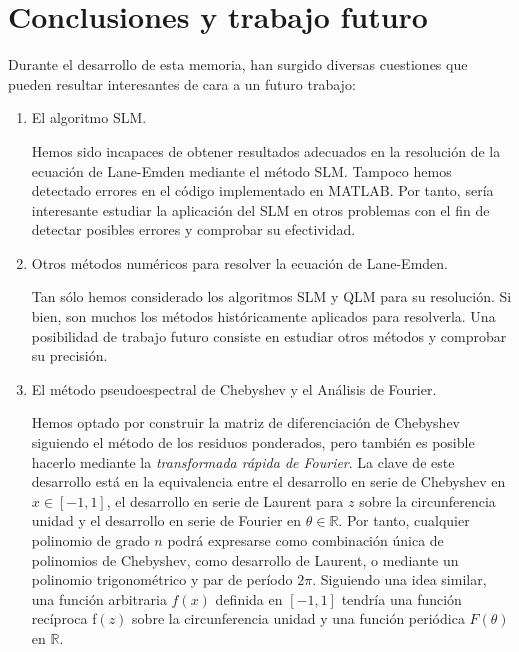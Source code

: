 \documentclass[main.tex]{subfiles}
\begin{document}
\chapter*{Conclusiones y trabajo futuro}
		
Durante el desarrollo de esta memoria, han surgido diversas
cuestiones que pueden resultar interesantes de cara a un futuro
trabajo:
	
\begin{enumerate}[label=\textbullet]
		
		
		
  \item El algoritmo SLM.
		
  Hemos sido incapaces de obtener resultados adecuados en la
  resolución de la ecuación de Lane-Emden mediante el método SLM. 
  Tampoco hemos detectado errores en el código implementado en MATLAB. 
  Por tanto, sería interesante estudiar la aplicación del SLM en otros
  problemas con el fin de detectar posibles errores y comprobar su
  efectividad.
	
  \item Otros métodos numéricos para resolver la ecuación de
  Lane-Emden.
		
Tan sólo hemos considerado los algoritmos SLM y QLM
  para su resolución. 
  Si bien, son muchos los métodos históricamente aplicados para
  resolverla. 
  Una posibilidad de trabajo futuro consiste en estudiar otros métodos
  y comprobar su precisión. 
		
		
		
		
  \item El método pseudoespectral de Chebyshev y el Análisis de Fourier.
		
  Hemos optado por construir la matriz de diferenciación de Chebyshev siguiendo el método de los residuos
  ponderados, pero también es posible hacerlo mediante la {\itshape
   transformada rápida de Fourier}. 
  La clave de este desarrollo está en la equivalencia entre el
  desarrollo en serie de Chebyshev en $x\in\left[-1,1\right]$, el desarrollo en
  serie de Laurent para $z$ sobre la circunferencia unidad y el
  desarrollo en serie de Fourier en $\theta\in\mathds{R}$. 
  Por tanto, cualquier polinomio de grado $n$ podrá expresarse como
  combinación única de polinomios de Chebyshev, como desarrollo de
  Laurent, o mediante un polinomio trigonométrico y par de período
  $2\pi$. 
  Siguiendo una idea similar, una función arbitraria $f(x)$ definida
  en $[-1,1]$ tendría una función recíproca
  {\selectfont f}$(z)$ sobre la circunferencia unidad
  y una función periódica $F(\theta)$ en $\mathds{R}$.
		

\end{enumerate}
\end{document}
